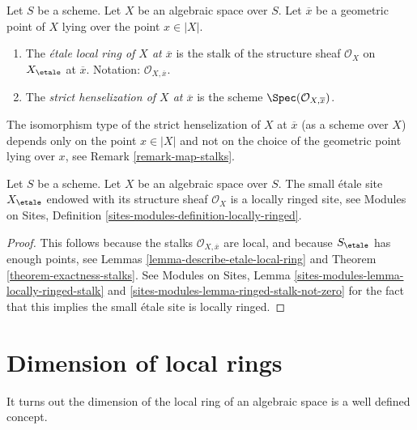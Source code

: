 \begin{definition}
\label{definition-etale-local-rings}
Let $S$ be a scheme.
Let $X$ be an algebraic space over $S$.
Let $\overline{x}$ be a geometric point of $X$ lying over the point
$x \in |X|$.
\begin{enumerate}
\item The {\it \'etale local ring of $X$ at $\overline{x}$}
is the stalk of the structure sheaf $\mathcal{O}_X$ on $X_\etale$
at $\overline{x}$.
Notation: $\mathcal{O}_{X, \overline{x}}$.
\item The {\it strict henselization of $X$ at $\overline{x}$}
is the scheme $\Spec(\mathcal{O}_{X, \overline{x}})$.
\end{enumerate}
\end{definition}

\noindent
The isomorphism type of the strict henselization of $X$ at $\overline{x}$
(as a scheme over $X$) depends only on the point $x \in |X|$ and not on
the choice of the geometric point lying over $x$, see
Remark \ref{remark-map-stalks}.

\begin{lemma}
\label{lemma-etale-site-locally-ringed}
Let $S$ be a scheme.
Let $X$ be an algebraic space over $S$.
The small \'etale site $X_\etale$ endowed with its
structure sheaf $\mathcal{O}_X$ is a locally ringed site, see
Modules on Sites, Definition \ref{sites-modules-definition-locally-ringed}.
\end{lemma}

\begin{proof}
This follows because the stalks
$\mathcal{O}_{X, \overline{x}}$ are
local, and because $S_\etale$ has enough points, see
Lemmas \ref{lemma-describe-etale-local-ring} and
Theorem \ref{theorem-exactness-stalks}.
See
Modules on Sites, Lemma \ref{sites-modules-lemma-locally-ringed-stalk} and
\ref{sites-modules-lemma-ringed-stalk-not-zero}
for the fact that this implies the small \'etale site is locally ringed.
\end{proof}




\section{Dimension of local rings}
\label{section-dimension-local-ring}

\noindent
It turns out the dimension of the local ring of an algebraic space is a
well defined concept.

